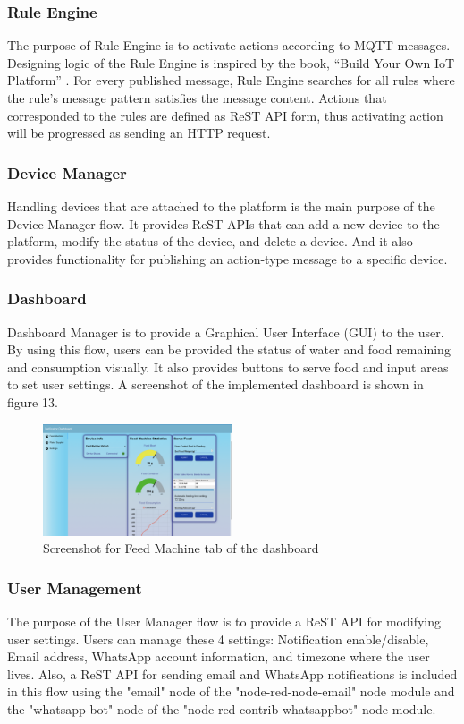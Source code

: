 ﻿\documentclass[conference]{IEEEtran}
\begin{document}
\subsubsection{Rule Engine}
The purpose of Rule Engine is to activate actions according to MQTT messages.
Designing logic of the Rule Engine is inspired by the book, “Build Your Own IoT Platform” \cite{b14}.
For every published message, Rule Engine searches for all rules where the rule’s message pattern satisfies the message content.
Actions that corresponded to the rules are defined as ReST API form, thus activating action will be progressed as sending an HTTP request.

\subsubsection{Device Manager}
Handling devices that are attached to the platform is the main purpose of the Device Manager flow.
It provides ReST APIs that can add a new device to the platform, modify the status of the device, and delete a device.
And it also provides functionality for publishing an action-type message to a specific device.

\subsubsection{Dashboard}
Dashboard Manager is to provide a Graphical User Interface (GUI) to the user.
By using this flow, users can be provided the status of water and food remaining and consumption visually.
It also provides buttons to serve food and input areas to set user settings. A screenshot of the implemented dashboard is shown in figure 13.

\begin{figure}[htbp]
\centerline{\includegraphics[width=0.5\textwidth]{./images/feed_machine_ui.png}}
\caption{Screenshot for Feed Machine tab of the dashboard}
\label{fig}
\end{figure}

\subsubsection{User Management}
The purpose of the User Manager flow is to provide a ReST API for modifying user settings.
Users can manage these 4 settings: Notification enable/disable, Email address, WhatsApp account information, and timezone where the user lives.
Also, a ReST API for sending email and WhatsApp notifications is included in this flow using the "email" node of the "node-red-node-email" node module and the "whatsapp-bot" node of the "node-red-contrib-whatsappbot" node module.
\end{document}

